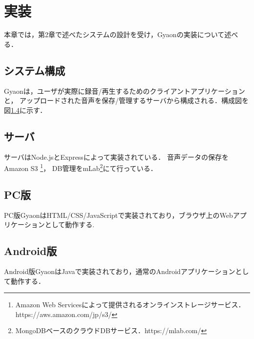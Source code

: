 \chapter{実装}
\label{chap:implementation}

本章では，第2章で述べたシステムの設計を受け，Gyaonの実装について述べる．

\newpage

\section{システム構成}
Gyaonは，ユーザが実際に録音/再生するためのクライアントアプリケーションと，
アップロードされた音声を保存/管理するサーバから構成される．構成図を図\ref{}に示す．




\section{サーバ}
サーバはNode.jsとExpressによって実装されている．
音声データの保存をAmazon S3
\footnote{\textsf{Amazon Web Servicesによって提供されるオンラインストレージサービス．https://aws.amazon.com/jp/s3/}}，
DB管理をmLab\footnote{\textsf{MongoDBベースのクラウドDBサービス．https://mlab.com/}}にて行っている．

\section{PC版}
PC版GyaonはHTML/CSS/JavaScriptで実装されており，ブラウザ上のWebアプリケーションとして動作する.

\section{Android版}
Android版GyaonはJavaで実装されており，通常のAndroidアプリケーションとして動作する．
